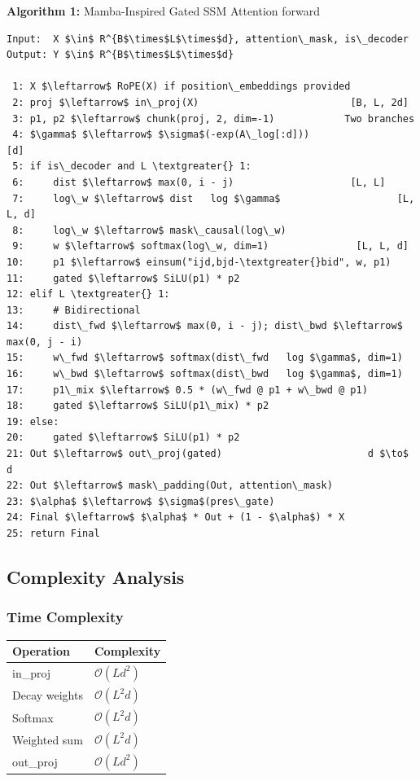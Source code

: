 \textbf{Algorithm 1:} Mamba-Inspired Gated SSM Attention forward
\begin{lstlisting}
Input:  X $\in$ R^{B$\times$L$\times$d}, attention\_mask, is\_decoder
Output: Y $\in$ R^{B$\times$L$\times$d}

 1: X $\leftarrow$ RoPE(X) if position\_embeddings provided
 2: proj $\leftarrow$ in\_proj(X)                          [B, L, 2d]
 3: p1, p2 $\leftarrow$ chunk(proj, 2, dim=-1)            Two branches
 4: $\gamma$ $\leftarrow$ $\sigma$(-exp(A\_log[:d]))                      [d]
 5: if is\_decoder and L \textgreater{} 1:
 6:     dist $\leftarrow$ max(0, i - j)                    [L, L]
 7:     log\_w $\leftarrow$ dist   log $\gamma$                    [L, L, d]
 8:     log\_w $\leftarrow$ mask\_causal(log\_w)
 9:     w $\leftarrow$ softmax(log\_w, dim=1)               [L, L, d]
10:     p1 $\leftarrow$ einsum("ijd,bjd-\textgreater{}bid", w, p1)
11:     gated $\leftarrow$ SiLU(p1) * p2
12: elif L \textgreater{} 1:
13:     # Bidirectional
14:     dist\_fwd $\leftarrow$ max(0, i - j); dist\_bwd $\leftarrow$ max(0, j - i)
15:     w\_fwd $\leftarrow$ softmax(dist\_fwd   log $\gamma$, dim=1)
16:     w\_bwd $\leftarrow$ softmax(dist\_bwd   log $\gamma$, dim=1)
17:     p1\_mix $\leftarrow$ 0.5 * (w\_fwd @ p1 + w\_bwd @ p1)
18:     gated $\leftarrow$ SiLU(p1\_mix) * p2
19: else:
20:     gated $\leftarrow$ SiLU(p1) * p2
21: Out $\leftarrow$ out\_proj(gated)                         d $\to$ d
22: Out $\leftarrow$ mask\_padding(Out, attention\_mask)
23: $\alpha$ $\leftarrow$ $\sigma$(pres\_gate)
24: Final $\leftarrow$ $\alpha$ * Out + (1 - $\alpha$) * X
25: return Final
\end{lstlisting}

\subsection{Complexity Analysis}

\subsubsection{Time Complexity}

\begin{table}[H]
\centering
\small
\begin{tabular}{ll}
\toprule
\textbf{Operation} & \textbf{Complexity} \\
\midrule
in\_proj & $\mathcal{O}(L d^2)$ \\
Decay weights & $\mathcal{O}(L^2 d)$ \\
Softmax & $\mathcal{O}(L^2 d)$ \\
Weighted sum & $\mathcal{O}(L^2 d)$ \\
out\_proj & $\mathcal{O}(L d^2)$ \\
\bottomrule
\end{tabular}
\end{table}

